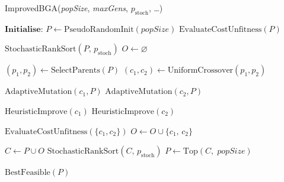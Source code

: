 \documentclass[12pt]{article}
\begin{document}
\vspace{1em}
\begin{algorithm}[htbp]
  \caption{ImprovedBGA(\textit{popSize}, \textit{maxGens}, \(\textit{p}_{\mathrm{stoch}}\), \dots)}
  \label{alg:improved_bga}
  \begin{algorithmic}[1]
    \State \(\textbf{Initialise:}\)
    \State $P \gets \text{PseudoRandomInit}(\textit{popSize})$ 
    \State $\text{EvaluateCostUnfitness}(P)$ 
    
      \State $\text{StochasticRankSort}(P,\, \textit{p}_{\mathrm{stoch}})$ 
      \State $O \gets \varnothing$ 

        \State $(p_1, p_2) \gets \text{SelectParents}(P)$ 
        \State $(c_1, c_2) \gets \text{UniformCrossover}(p_1, p_2)$ 
        
        \State $\text{AdaptiveMutation}(c_1, P)$ 
        \State $\text{AdaptiveMutation}(c_2, P)$

        \State $\text{HeuristicImprove}(c_1)$ 
        \State $\text{HeuristicImprove}(c_2)$
        
        \State $\text{EvaluateCostUnfitness}(\{c_1, c_2\})$
        \State $O \gets O \cup \{c_1,\, c_2\}$
      \EndWhile

      \State $C \gets P \cup O$ 
      \State $\text{StochasticRankSort}(C,\, \textit{p}_{\mathrm{stoch}})$ 
      \State $P \gets \text{Top}(C,\; \textit{popSize})$
    \EndFor
    
    \State \Return $\text{BestFeasible}(P)$ 
  \end{algorithmic}
\end{algorithm}
\end{document}
